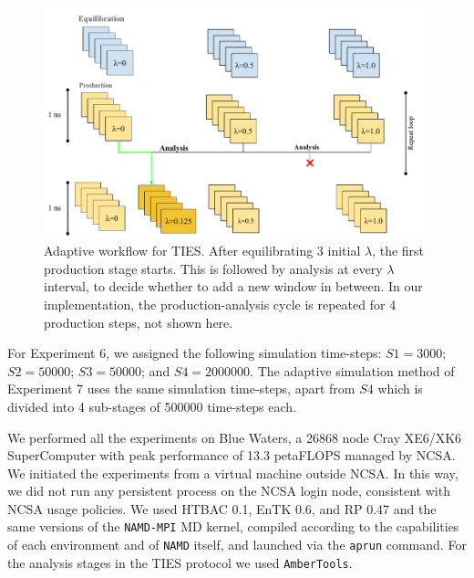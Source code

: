 \begin{figure}
  \centering
  \includegraphics[width=\columnwidth]{figures/Adaptive_TIES.pdf}
  \caption{Adaptive workflow for TIES. After equilibrating 3 initial
  $\lambda$, the first production stage starts. This is followed by analysis
  at every $\lambda$ interval, to decide whether to add a new window in
  between. In our implementation, the production-analysis cycle is repeated
  for 4 production steps, not shown here.}
\label{fig:adaptive_TIES}
\end{figure}


For Experiment 6, we assigned the following simulation time-steps: $S1=3000$;
$S2=50000$; $S3=50000$; and $S4=2000000$. The adaptive simulation method of
Experiment 7 uses the same simulation time-steps, apart from $S4$ which is
divided into 4 sub-stages of 500000 time-steps each. 


We performed all the experiments on Blue Waters, a 26868 node Cray XE6/XK6
SuperComputer with peak performance of 13.3 petaFLOPS managed by NCSA. We
initiated the experiments from a virtual machine outside NCSA. In this way,
we did not run any persistent process on the NCSA login node, consistent with
NCSA usage policies. We used HTBAC 0.1, EnTK 0.6, and RP 0.47 and the same
versions of the \texttt{NAMD-MPI} MD kernel, compiled according to the
capabilities of each environment and of \texttt{NAMD} itself, and launched
via the \texttt{aprun} command. For the analysis stages in the TIES protocol
we used \texttt{AmberTools}.

